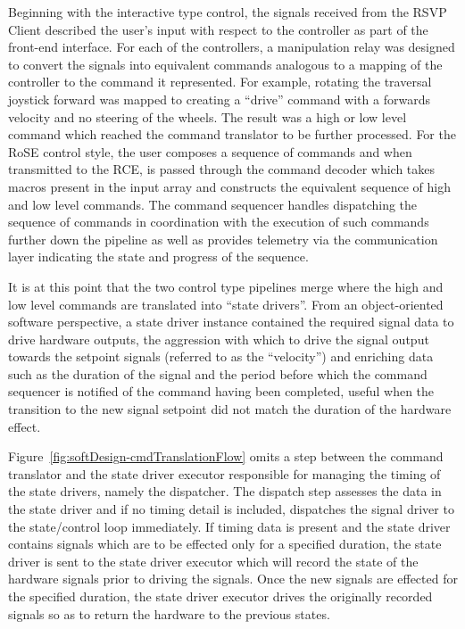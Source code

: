           Beginning with the interactive type control, the signals received from the RSVP Client described the user's input with respect to the controller as part of the front-end interface. For each of the controllers, a manipulation relay was designed to convert the signals into equivalent commands analogous to a mapping of the controller to the command it represented. For example, rotating the traversal joystick forward was mapped to creating a ``drive'' command with a forwards velocity and no steering of the wheels. The result was a high or low level command which reached the command translator to be further processed. For the RoSE control style, the user composes a sequence of commands and when transmitted to the RCE, is passed through the command decoder which takes macros present in the input array and constructs the equivalent sequence of high and low level commands. The command sequencer handles dispatching the sequence of commands in coordination with the execution of such commands further down the pipeline as well as provides telemetry via the communication layer indicating the state and progress of the sequence.
          
          It is at this point that the two control type pipelines merge where the high and low level commands are translated into ``state drivers''. 
          From an object-oriented software perspective, a state driver instance contained the required signal data to drive hardware outputs, the aggression with which to drive the signal output towards the setpoint signals (referred to as the ``velocity'') and enriching data such as the duration of the signal and the period before which the command sequencer is notified of the command having been completed, useful when the transition to the new signal setpoint did not match the duration of the hardware effect.
          
          Figure~\ref{fig:softDesign-cmdTranslationFlow} omits a step between the command translator and the state driver executor responsible for managing the timing of the state drivers, namely the dispatcher. The dispatch step assesses the data in the state driver and if no timing detail is included, dispatches the signal driver to the state/control loop immediately. If timing data is present and the state driver contains signals which are to be effected only for a specified duration, the state driver is sent to the state driver executor which will record the state of the hardware signals prior to driving the signals. Once the new signals are effected for the specified duration, the state driver executor drives the originally recorded signals so as to return the hardware to the previous states.
          
